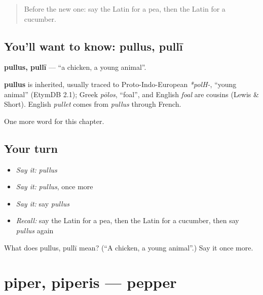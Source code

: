 \label{lesson:LA-C127-pullus}



\begin{quote}
Before the new one: say the Latin for a pea, then the Latin for a cucumber.
\end{quote}

\subsection*{You'll want to know: pullus, pullī}
\textbf{pullus, pullī} — \textquotedblleft{}a chicken, a young animal\textquotedblright{}.

\begin{cousinweb}
\textbf{pullus} is inherited, usually traced to Proto-Indo-European \emph{*polH-}, \textquotedblleft{}young animal\textquotedblright{} (EtymDB 2.1); Greek \emph{pōlos}, \textquotedblleft{}foal\textquotedblright{}, and English \emph{foal} are cousins (Lewis \& Short). English \emph{pullet} comes from \emph{pullus} through French.
\end{cousinweb}

\begin{grammarlens}[title={What you've built}]
One more word for this chapter.
\end{grammarlens}

\subsection*{Your turn}
\begin{itemize}
\raggedright
  \item \emph{Say it:} \emph{pullus}
  \item \emph{Say it:} \emph{pullus}, once more
  \item \emph{Say it:} say \emph{pullus}
  \item \emph{Recall:} say the Latin for a pea, then the Latin for a cucumber, then say \emph{pullus} again
\end{itemize}

\begin{tcolorbox}[breakable,colback=teal!4,colframe=teal!35!black,title={Before you move on}]
What does pullus, pullī mean? (\textquotedblleft{}A chicken, a young animal\textquotedblright{}.) Say it once more.
\end{tcolorbox}
\section[piper, piperis]{piper, piperis — pepper}

